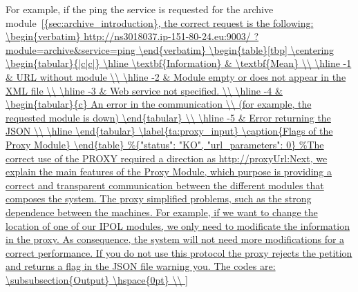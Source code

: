 For example, if the ping the service is requested for the archive module~\ref{{sec:archive_introduction}, the correct request is the following:
\begin{verbatim}
http://ns3018037.ip-151-80-24.eu:9003/
?module=archive&service=ping
\end{verbatim}


\begin{table}[tbp]
\centering
\begin{tabular}{|c|c|}
\hline
\textbf{Information} & \textbf{Mean} \\
\hline
-1   & URL without module \\
\hline
-2   & Module empty or does not appear in the XML file \\
\hline
-3   & Web service not specified. \\
\hline
-4   & 
\begin{tabular}{c}
An error in the communication \\
(for example, the requested module is down)
\end{tabular}
\\
\hline
-5   & Error returning the JSON \\
\hline
\end{tabular}
\label{ta:proxy_input}
\caption{Flags of the Proxy Module} 
\end{table}


 


If you do not use this protocol the proxy rejects the petition and returns a flag in the JSON file warning you.

The codes are: 

\subsubsection{Output}  \hspace{0pt} \\

}
